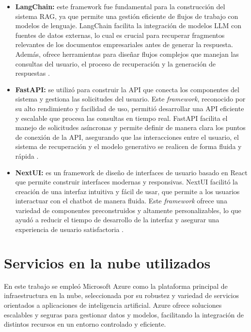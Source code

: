 \begin{itemize}
	\item \textbf{LangChain:} este framework fue fundamental para la construcción del sistema RAG, ya que permite una gestión 
	eficiente de flujos de trabajo con modelos de lenguaje. LangChain facilita la integración de modelos LLM con fuentes de datos externas, 
	lo cual es crucial para recuperar fragmentos relevantes de los documentos empresariales 
	antes de generar la respuesta. Además, ofrece herramientas para diseñar flujos complejos 
	que manejan las consultas del usuario, el proceso de recuperación y la generación de respuestas \citep{website:langchain}.
	\item \textbf{FastAPI:} se utilizó para construir la API que conecta los componentes del sistema y gestiona las solicitudes del usuario. 
	Este \textit{framework}, reconocido por su alto rendimiento y facilidad de uso, permitió desarrollar una API eficiente y escalable que procesa 
	las consultas en tiempo real. FastAPI facilita el manejo de solicitudes asíncronas y permite definir de manera clara los puntos 
	de conexión de la API, asegurando que las interacciones entre el usuario, el sistema de recuperación y el modelo generativo se 
	realicen de forma fluida y rápida \citep{website:fastapi}.
	\item \textbf{NextUI:} es un framework de diseño de interfaces de usuario 
	basado en React que permite construir interfaces modernas y responsivas. NextUI facilitó la creación de una interfaz intuitiva 
	y fácil de usar, que permite a los usuarios interactuar con el chatbot de manera fluida. Este \textit{framework} ofrece una variedad de 
	componentes preconstruidos y altamente personalizables, lo que ayudó a reducir el tiempo de desarrollo de la interfaz y asegurar 
	una experiencia de usuario satisfactoria \citep{website:nextui}.
\end{itemize}

\section{Servicios en la nube utilizados}

En este trabajo se empleó Microsoft Azure \citep{website:azure} como la plataforma principal de infraestructura en la nube, seleccionada por su robustez y 
variedad de servicios orientados a aplicaciones de inteligencia artificial. Azure ofrece soluciones 
escalables y seguras para gestionar datos y modelos, facilitando la integración de distintos recursos en un entorno controlado y eficiente.

